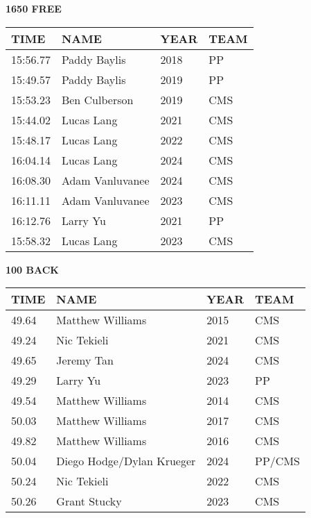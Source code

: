 \vspace{0.4cm}

\begin{minipage}[t]{0.48\textwidth}
\centering
\textbf{1650 FREE}\\[0.05cm]
\begin{tabular}{@{}p{1.8cm}p{2.8cm}p{1.2cm}p{1.4cm}@{}}
\hline
\textbf{TIME} & \textbf{NAME} & \textbf{YEAR} & \textbf{TEAM} \\
\hline
15:56.77 & Paddy Baylis & 2018 & PP \\
15:49.57 & Paddy Baylis & 2019 & PP \\
15:53.23 & Ben Culberson & 2019 & CMS \\
15:44.02 & Lucas Lang & 2021 & CMS \\
15:48.17 & Lucas Lang & 2022 & CMS \\
16:04.14 & Lucas Lang & 2024 & CMS \\
16:08.30 & Adam Vanluvanee & 2024 & CMS \\
16:11.11 & Adam Vanluvanee & 2023 & CMS \\
16:12.76 & Larry Yu & 2021 & PP \\
15:58.32 & Lucas Lang & 2023 & CMS \\
\hline
\end{tabular}
\end{minipage}\hfill
\begin{minipage}[t]{0.48\textwidth}
\centering
\textbf{100 BACK}\\[0.05cm]
\begin{tabular}{@{}p{1.8cm}p{2.8cm}p{1.2cm}p{1.4cm}@{}}
\hline
\textbf{TIME} & \textbf{NAME} & \textbf{YEAR} & \textbf{TEAM} \\
\hline
49.64 & Matthew Williams & 2015 & CMS \\
49.24 & Nic Tekieli & 2021 & CMS \\
49.65 & Jeremy Tan & 2024 & CMS \\
49.29 & Larry Yu & 2023 & PP \\
49.54 & Matthew Williams & 2014 & CMS \\
50.03 & Matthew Williams & 2017 & CMS \\
49.82 & Matthew Williams & 2016 & CMS \\
50.04 & Diego Hodge/Dylan Krueger & 2024 & PP/CMS \\
50.24 & Nic Tekieli & 2022 & CMS \\
50.26 & Grant Stucky & 2023 & CMS \\
\hline
\end{tabular}
\end{minipage}

